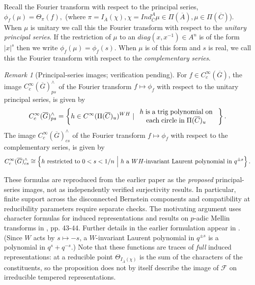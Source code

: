 \documentclass[12pt,letterpaper]{article}
\theoremstyle{definition}
\theoremstyle{remark}
\newtheorem{remark}[theorem]{Remark}
\newcommand{\sF}{\mathscr F}
\newcommand{\verify}[1]{\textit{[verification pending: #1]}}
\begin{document}
Recall the Fourier transform with respect to the 
principal series,
$
\phi_f(\mu)=\Theta _\pi(f),
$
(where $\pi =I_{\overline{A}}(\chi ),
 \chi =Ind_{\overline{C}}^{A }\mu
\in \Pi(\overline{A }),
\mu\in \Pi(\overline{C })$).
When $\mu$ is unitary we call this the
Fourier transform with respect to the 
{\it unitary principal series}.
If the restriction of $\mu$ to an
$diag(x,x^{-1})\in A^n$ is of the form $|x|^s$ then
we write $\phi_f(\mu)=\phi_f(s)$.
When $\mu$ is of this form and $s$ is real, 
we call this the
Fourier transform with respect to the 
{\it complementary series}.

\begin{remark}[Principal-series images; verification pending]\label{prop:image}
For $f\in C_c^\infty (\overline{G })$, the image
$C_c^\infty (\overline{G })_{ps}^{\wedge }$
of the Fourier transform $f\longmapsto \phi_f$
with respect to the unitary principal series,
is given by 
\[
C_c^\infty (\overline{G })_{ps}^{\wedge }
=\left\{h\in C^\infty(\Pi (\overline{C})_u)^{WH}\;|\;
\begin{array}{c}
h\;{\rm is\;a\;trig\;polynomial\;on} \\ 
{\rm each\;circle\;in\;}\Pi(\overline{C})_u
\end{array}
\;\right\}.
\]
The image
$C_c^\infty (\overline{G })_{cs}^{\wedge }$
of the Fourier transform $f\longmapsto \phi_f$
with respect to the complementary series,
is given by 
\[
C_c^\infty (\overline{G })_{cs}^{\wedge }
\cong \left\{h\ {\rm restricted \ to}\ 0<s<1/n\ \Big|\ h\ {\rm a}\ WH\mbox{-invariant\ Laurent\ polynomial\ in\ }q^{\pm s}\right\}.
\]
\end{remark}

These formulas are reproduced from the earlier paper as the
\emph{proposed} principal-series images, not as independently verified
surjectivity results.  In particular, finite support across the
disconnected Bernstein components and compatibility at reducibility
parameters require separate checks.  The motivating argument uses character formulas for induced representations and results on $p$-adic Mellin transforms
in \cite{Ta75}, pp. 43-44. Further details in the earlier formulation appear in \cite{Jo01}. (Since $W$ acts by $s\mapsto-s$, a $W$-invariant Laurent
polynomial in $q^{\pm s}$ is a polynomial in $q^s+q^{-s}$.)
Note that these functions are traces of \emph{full} induced
representations: at a reducible point $\Theta_{I_{\overline{A}}(\chi)}$ is the sum
of the characters of the constituents, so the proposition does not by itself
describe the image of $\sF$ on irreducible tempered representations.
\end{document}
